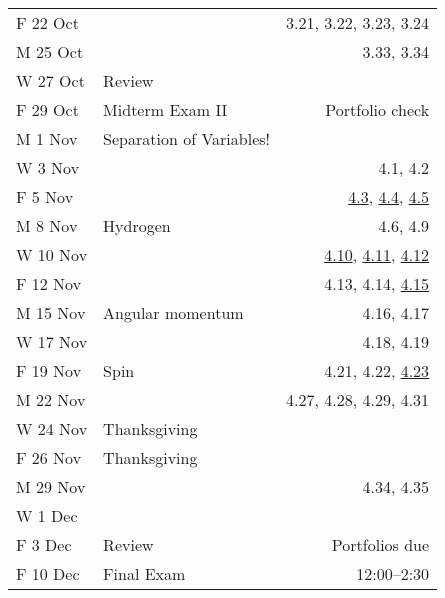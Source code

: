 \documentclass{article}
\begin{document}
\begin{minipage}{\textwidth}
\begin{tabular}{llr}
F 22 Oct& & 3.21, 3.22, 3.23, 3.24\\
M 25 Oct&  & 3.33, 3.34\\
W 27 Oct& Review & \\
F 29 Oct& Midterm Exam II& Portfolio check\\
M  1 Nov& Separation of Variables! & \\
W  3 Nov& & 4.1, 4.2\\
F  5 Nov& & {\underline{4.3}}, {\underline{4.4}}, {\underline{4.5}}\\
M  8 Nov& Hydrogen & 4.6, 4.9\\
W 10 Nov& & {\underline{4.10}}, {\underline{4.11}}, {\underline{4.12}}\\
F 12 Nov& & 4.13, 4.14, {\underline{4.15}}\\
M 15 Nov& Angular momentum & 4.16, 4.17\\
W 17 Nov& & 4.18, 4.19\\
F 19 Nov& Spin & 4.21, 4.22, {\underline{4.23}}\\
M 22 Nov&  & 4.27, 4.28, 4.29, 4.31\\
W 24 Nov& Thanksgiving & \\
F 26 Nov& Thanksgiving & \\
M 29 Nov&  & 4.34, 4.35\\
W  1 Dec& & \\
F  3 Dec& Review & Portfolios due\\

F 10 Dec& Final Exam & 12:00--2:30
\end{tabular}
\end{minipage}
\end{document}
